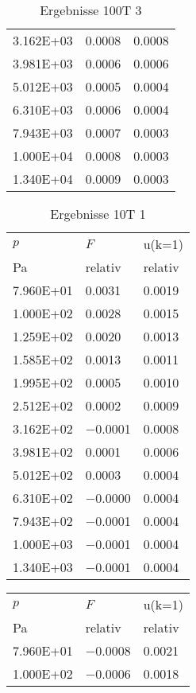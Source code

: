 \begin{table}
\begin{tabular}{l l l }
\num{3.162E+03}&\num{0.0008}&\num{0.0008}\\
\num{3.981E+03}&\num{0.0006}&\num{0.0006}\\
\num{5.012E+03}&\num{0.0005}&\num{0.0004}\\
\num{6.310E+03}&\num{0.0006}&\num{0.0004}\\
\num{7.943E+03}&\num{0.0007}&\num{0.0003}\\
\num{1.000E+04}&\num{0.0008}&\num{0.0003}\\
\num{1.340E+04}&\num{0.0009}&\num{0.0003}\\
\bottomrule
\end{tabular}\caption{Ergebnisse 100T 3}\end{table}\begin{table}\begin{tabular}{l l l }
\toprule
$p$&$F$&u(k=1)\\
 Pa & relativ & relativ\\\midrule
\num{7.960E+01}&\num{0.0031}&\num{0.0019}\\
\num{1.000E+02}&\num{0.0028}&\num{0.0015}\\
\num{1.259E+02}&\num{0.0020}&\num{0.0013}\\
\num{1.585E+02}&\num{0.0013}&\num{0.0011}\\
\num{1.995E+02}&\num{0.0005}&\num{0.0010}\\
\num{2.512E+02}&\num{0.0002}&\num{0.0009}\\
\num{3.162E+02}&\num{-0.0001}&\num{0.0008}\\
\num{3.981E+02}&\num{0.0001}&\num{0.0006}\\
\num{5.012E+02}&\num{0.0003}&\num{0.0004}\\
\num{6.310E+02}&\num{-0.0000}&\num{0.0004}\\
\num{7.943E+02}&\num{-0.0001}&\num{0.0004}\\
\num{1.000E+03}&\num{-0.0001}&\num{0.0004}\\
\num{1.340E+03}&\num{-0.0001}&\num{0.0004}\\
\bottomrule
\end{tabular}\caption{Ergebnisse 10T 1}\end{table}\begin{table}\begin{tabular}{l l l }
\toprule
$p$&$F$&u(k=1)\\
 Pa & relativ & relativ\\\midrule
\num{7.960E+01}&\num{-0.0008}&\num{0.0021}\\
\num{1.000E+02}&\num{-0.0006}&\num{0.0018}\\

\end{tabular}
\end{table}
